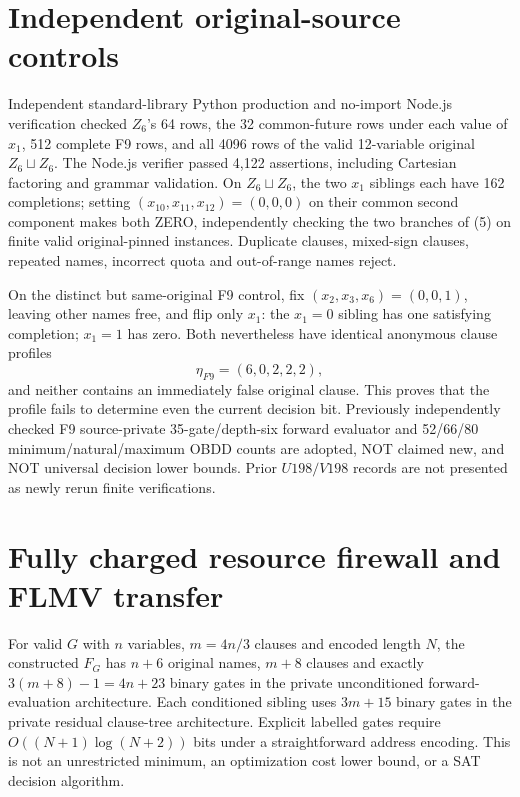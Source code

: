 \documentclass[11pt]{article}
\begin{document}
\section{Independent original-source controls}
Independent standard-library Python production and no-import Node.js verification checked $Z_6$'s 64 rows, the 32 common-future rows under each value of $x_1$, 512 complete F9 rows, and all 4096 rows of the valid 12-variable original $Z_6\sqcup Z_6$. The Node.js verifier passed 4,122 assertions, including Cartesian factoring and grammar validation. On $Z_6\sqcup Z_6$, the two $x_1$ siblings each have 162 completions; setting $(x_{10},x_{11},x_{12})=(0,0,0)$ on their common second component makes both ZERO, independently checking the two branches of (5) on finite valid original-pinned instances. Duplicate clauses, mixed-sign clauses, repeated names, incorrect quota and out-of-range names reject.

On the distinct but same-original F9 control, fix $(x_2,x_3,x_6)=(0,0,1)$, leaving other names free, and flip only $x_1$: the $x_1=0$ sibling has one satisfying completion; $x_1=1$ has zero. Both nevertheless have identical anonymous clause profiles
\[
\eta_{F9}=(6,0,2,2,2),
\tag{7}
\]
and neither contains an immediately false original clause. This proves that the profile fails to determine even the current decision bit. Previously independently checked F9 source-private 35-gate/depth-six forward evaluator and 52/66/80 minimum/natural/maximum OBDD counts are adopted, NOT claimed new, and NOT universal decision lower bounds. Prior $U198/V198$ records are not presented as newly rerun finite verifications.

\section{Fully charged resource firewall and FLMV transfer}
For valid $G$ with $n$ variables, $m=4n/3$ clauses and encoded length $N$, the constructed $F_G$ has $n+6$ original names, $m+8$ clauses and exactly $3(m+8)-1=4n+23$ binary gates in the private unconditioned forward-evaluation architecture. Each conditioned sibling uses $3m+15$ binary gates in the private residual clause-tree architecture. Explicit labelled gates require $O((N+1)\log(N+2))$ bits under a straightforward address encoding. This is not an unrestricted minimum, an optimization cost lower bound, or a SAT decision algorithm.
\end{document}
